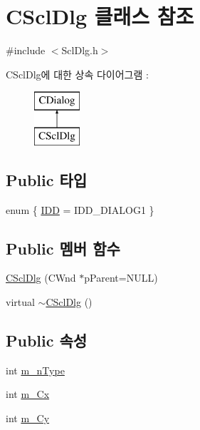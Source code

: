 \hypertarget{class_c_scl_dlg}{\section{C\-Scl\-Dlg 클래스 참조}
\label{class_c_scl_dlg}
}


{\ttfamily \#include $<$Scl\-Dlg.\-h$>$}

C\-Scl\-Dlg에 대한 상속 다이어그램 \-: \begin{figure}[H]
\begin{center}
\leavevmode
\includegraphics[height=2.000000cm]{class_c_scl_dlg}
\end{center}
\end{figure}
\subsection*{Public 타입}
\begin{DoxyCompactItemize}
\item 
enum \{ \hyperlink{class_c_scl_dlg_a1ed7185c27a2ce41c94d772b6b1bd6eca37c13cd75af0df4b69cff990e78b8c5c}{I\-D\-D} = I\-D\-D\-\_\-\-D\-I\-A\-L\-O\-G1
 \}
\end{DoxyCompactItemize}
\subsection*{Public 멤버 함수}
\begin{DoxyCompactItemize}
\item 
\hyperlink{class_c_scl_dlg_a0024f026091f91c0850e77b103f5f30a}{C\-Scl\-Dlg} (C\-Wnd $\ast$p\-Parent=N\-U\-L\-L)
\item 
virtual \hyperlink{class_c_scl_dlg_a643c698da9bdf5e630a9c452812b0db5}{$\sim$\-C\-Scl\-Dlg} ()
\end{DoxyCompactItemize}
\subsection*{Public 속성}
\begin{DoxyCompactItemize}
\item 
int \hyperlink{class_c_scl_dlg_aa52708335531c455850915172bff26ba}{m\-\_\-n\-Type}
\item 
int \hyperlink{class_c_scl_dlg_ae24bfb6ef6de4cb6cbc6f3b6cdae619b}{m\-\_\-\-Cx}
\item 
int \hyperlink{class_c_scl_dlg_a6864c7ad7a17b92a9c9e670a871cf9d9}{m\-\_\-\-Cy}
\end{DoxyCompactItemize}
